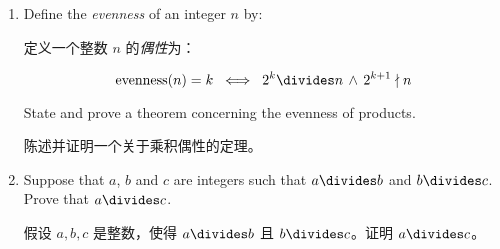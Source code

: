 \begin{enumerate}
{\begin{proof}
    假设 $x$ 是一个实数且 $x\not\in\Integers$。令 $a = \lfloor x \rfloor$。根据下取整函数的定义，我们有 $a \in\Integers$ 且 $ a \leq x < a+1$。因为 $x \not\in\Integers$，我们知道 $x \neq a$，所以我们可以将不等式加强为 $a < x < a+1$。将这个不等式乘以-1，我们得到 $-a > -x > -a - 1$。这个不等式可以弱化为 $-a > -x \geq -a - 1$。最后，注意到（因为 $-a-1 \in\Integers$ 且 $-a = (-a-1)+1$）我们已经证明了 $\lfloor -x \rfloor \, = \, -a-1$。因此，通过代换我们得到 $\lfloor x \rfloor+\lfloor -x \rfloor \; = \; a + (-a-1) \; = \; -1$，正如所求。
    \end{proof}
    
    \vfill
    
    }
    \wbvfill
    
    \hintspagebreak
    
    \item Define the \emph{evenness} of an integer $n$ by:
    
    定义一个整数 $n$ 的\emph{偶性}为：
    
    \[ \mbox{evenness} (n) = k \; \iff \;  
     2^k \divides n \, \land \, 2^{k+1} \nmid n \]
    
    State and prove a theorem concerning the evenness of products.
    
    陈述并证明一个关于乘积偶性的定理。
    
    
    \wbvfill
    
    \workbookpagebreak
    
    \item Suppose that $a$, $b$ and $c$ are integers such that $a \divides b$
    and $b \divides c$.  Prove that $a \divides c$.
    
    假设 $a, b, c$ 是整数，使得 $a \divides b$ 且 $b \divides c$。证明 $a \divides c$。
    
    

\end{enumerate}
